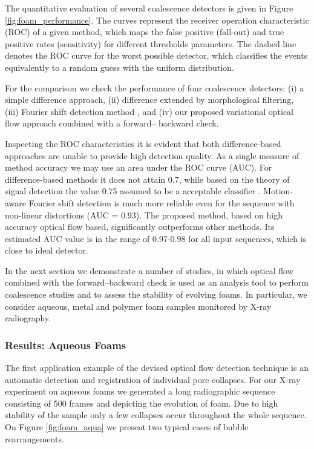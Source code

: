The quantitative evaluation of several coalescence detectors is given in Figure \ref{fig:foam_performance}. The curves represent the
receiver operation characteristic (ROC) of a given method,
which maps the false positive (fall-out) and true positive rates (sensitivity) for different thresholds parameters. The dashed line denotes the
ROC curve for the worst possible detector, which classifies the events equivalently to a random guess with the uniform distribution.

For the comparison we check the performance of four coalescence
detectors: (i) a simple difference approach, (ii) difference
extended by morphological filtering, (iii) Fourier shift detection
method \cite{Myagotin09}, and (iv) our proposed
variational optical flow approach combined with a forward–
backward check.

Inspecting the ROC characteristics it is evident that both difference-based approaches are unable to provide high detection quality. As a single measure of method accuracy we may use an area under the ROC curve (AUC). For difference-based methods it does not attain 0.7, while based on the theory of signal detection the value 0.75 assumed to be a acceptable classifier \cite{Swets88}. Motion-aware Fourier shift detection is
much more reliable even for the sequence with non-linear distortions (AUC = 0.93).
The proposed method, based on high
accuracy optical flow based, significantly outperforms other methods. Its estimated AUC value is in the range of 0.97-0.98 for all input sequences, which is close to ideal detector.  

In the next section we demonstrate a number of studies, in which
optical flow combined with the forward–backward
check is used as an analysis tool to perform
coalescence studies and to assess the stability of evolving
foams. In particular, we consider aqueous, metal and polymer
foam samples monitored by X-ray radiography.
 


\subsubsection{Results: Aqueous Foams}
\label{foam_aqueous}

The first application example of the devised optical flow detection technique is an automatic detection and registration of individual pore
collapses. For our X-ray experiment on aqueous foams we generated a long radiographic sequence consisting of 500 frames and depicting the
evolution of foam. Due to high stability of the
sample only a few collapses occur throughout the whole sequence. 
On Figure \ref{fig:foam_aqua} we present two typical cases of bubble rearrangements.


